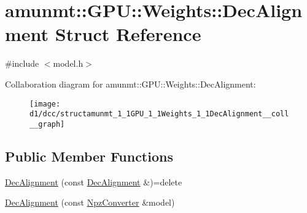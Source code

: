 \hypertarget{structamunmt_1_1GPU_1_1Weights_1_1DecAlignment}{}\section{amunmt\+:\+:G\+PU\+:\+:Weights\+:\+:Dec\+Alignment Struct Reference}
\label{structamunmt_1_1GPU_1_1Weights_1_1DecAlignment}


{\ttfamily \#include $<$model.\+h$>$}



Collaboration diagram for amunmt\+:\+:G\+PU\+:\+:Weights\+:\+:Dec\+Alignment\+:
\nopagebreak
\begin{figure}[H]
\begin{center}
\leavevmode
\texttt{[image: d1/dcc/structamunmt\_1\_1GPU\_1\_1Weights\_1\_1DecAlignment\_\_coll\_\_graph]}
\end{center}
\end{figure}
\subsection*{Public Member Functions}
\begin{DoxyCompactItemize}
\item 
\hyperlink{structamunmt_1_1GPU_1_1Weights_1_1DecAlignment_a0b826f830847470f13cd1177cbf5a815}{Dec\+Alignment} (const \hyperlink{structamunmt_1_1GPU_1_1Weights_1_1DecAlignment}{Dec\+Alignment} \&)=delete
\item 
\hyperlink{structamunmt_1_1GPU_1_1Weights_1_1DecAlignment_ab9f72f570ba3971d5f8bbdb72a4982bb}{Dec\+Alignment} (const \hyperlink{classamunmt_1_1GPU_1_1NpzConverter}{Npz\+Converter} \&model)
\end{DoxyCompactItemize}
